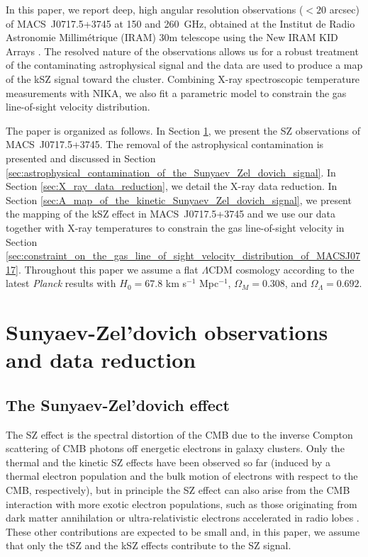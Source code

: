 \documentclass[twocolumn,traditabstract]{aa}
\begin{document}
In this paper, we report deep, high angular resolution observations ($<20$ arcsec) of \mbox{MACS~J0717.5+3745} at 150 and 260~GHz, obtained at the Institut de Radio Astronomie Millim\'etrique (IRAM) 30m telescope using the New IRAM KID Arrays \citep[NIKA,][]{Monfardini2011,Calvo2013,Adam2014,Catalano2014}. The resolved nature of the observations allows us for a robust treatment of the contaminating astrophysical signal and the data are used to produce a map of the kSZ signal toward the cluster. Combining X-ray spectroscopic temperature measurements with NIKA, we also fit a parametric model to constrain the gas line-of-sight velocity distribution.

The paper is organized as follows. In Section \ref{sec:sunyaev_Zel_dovich_observations_and_data_reduction}, we present the SZ observations of \mbox{MACS~J0717.5+3745}. The removal of the astrophysical contamination is presented and discussed in Section \ref{sec:astrophysical_contamination_of_the_Sunyaev_Zel_dovich_signal}. In Section \ref{sec:X_ray_data_reduction}, we detail the X-ray data reduction. In Section \ref{sec:A_map_of_the_kinetic_Sunyaev_Zel_dovich_signal}, we present the mapping of the kSZ effect in \mbox{MACS~J0717.5+3745} and we use our data together with X-ray temperatures to constrain the gas line-of-sight velocity in Section \ref{sec:constraint_on_the_gas_line_of_sight_velocity_distribution_of_MACSJ0717}. Throughout this paper we assume a flat $\Lambda$CDM cosmology according to the latest {\it Planck} results \citep{Planck2015XIII} with $H_0 = 67.8$ km s$^{-1}$ Mpc$^{-1}$, $\Omega_M = 0.308$, and $\Omega_{\Lambda} = 0.692$.

\section{Sunyaev-Zel'dovich observations and data reduction}\label{sec:sunyaev_Zel_dovich_observations_and_data_reduction}
\subsection{The Sunyaev-Zel'dovich effect}
The SZ effect is the spectral distortion of the CMB due to the inverse Compton scattering of CMB photons off energetic electrons in galaxy clusters. Only the thermal and the kinetic SZ effects have been observed so far (induced by a thermal electron population and the bulk motion of electrons with respect to the CMB, respectively), but in principle the SZ effect can also arise from the CMB interaction with more exotic electron populations, such as those originating from dark matter annihilation \citep{Colafrancesco2004} or ultra-relativistic electrons accelerated in radio lobes \citep{Colafrancesco2008}. These other contributions are expected to be small and, in this paper, we assume that only the tSZ and the kSZ effects contribute to the SZ signal.
\end{document}
